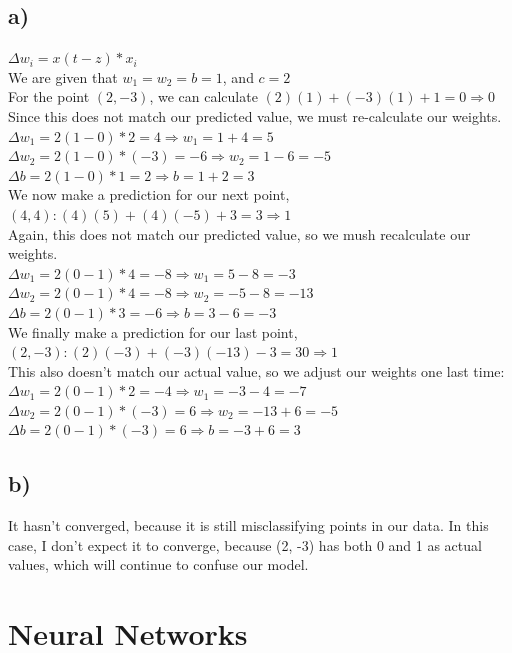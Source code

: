 \documentclass[12pt, letterpaper]{article}
\begin{document}
\subsection*{a)} $\Delta w_i=x(t-z)*x_i$\\
We are given that $w_1 = w_2 = b = 1$, and $c=2$\\
For the point $(2,-3)$, we can calculate $(2)(1)+(-3)(1)+1 = 0 \Rightarrow 0$\\
Since this does not match our predicted value, we must re-calculate our weights.\\
$\Delta w_1 = 2(1-0)*2 = 4 \Rightarrow w_1 = 1 + 4 = 5$\\
$\Delta w_2 = 2(1-0)*(-3) = -6 \Rightarrow w_2 = 1 - 6 = -5$\\
$\Delta b = 2(1-0)*1 = 2 \Rightarrow b = 1 + 2 = 3$\\
We now make a prediction for our next point, $(4, 4): (4)(5)+(4)(-5)+3 = 3 \Rightarrow 1$\\
Again, this does not match our predicted value, so we mush recalculate our weights.\\
$\Delta w_1 = 2(0-1)*4 = -8 \Rightarrow w_1 = 5 - 8 = -3$\\
$\Delta w_2 = 2(0-1)*4 = -8 \Rightarrow w_2 = -5 - 8 = -13$\\
$\Delta b = 2(0-1)*3 = -6 \Rightarrow b = 3 - 6 = -3$\\
We finally make a prediction for our last point, $(2, -3): (2)(-3)+(-3)(-13)-3 = 30 \Rightarrow 1$\\
This also doesn't match our actual value, so we adjust our weights one last time:\\
$\Delta w_1 = 2(0-1)*2 = -4 \Rightarrow w_1 = -3 - 4 = -7$\\
$\Delta w_2 = 2(0-1)*(-3) = 6 \Rightarrow w_2 = -13 + 6 = -5$\\
$\Delta b = 2(0-1)*(-3) = 6 \Rightarrow b = -3 + 6 = 3$\\

\subsection*{b)} It hasn't converged, because it is still misclassifying points in our data. In this case, I don't expect it to converge, because (2, -3) has both 0 and 1 as actual values, which will continue to confuse our model.

\newpage
\section{ Neural Networks}
\end{document}
